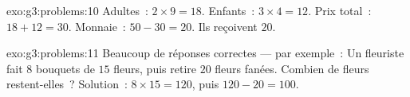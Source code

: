 \begin{solution}{exo:g3:problems:10}
Adultes~: $2 \times 9 = 18$. Enfants~: $3 \times 4 = 12$. Prix
total~: $18 + 12 = 30$. Monnaie~: $50 - 30 = 20$. Ils reçoivent
$20$.
\end{solution}

\begin{solution}{exo:g3:problems:11}
Beaucoup de réponses correctes --- par exemple~:
\guillemotleft{} Un fleuriste fait $8$ bouquets de $15$ fleurs, puis
retire $20$ fleurs fanées. Combien de fleurs restent-elles~?
\guillemotright{} Solution~: $8 \times 15 = 120$, puis
$120 - 20 = 100$.
\end{solution}
